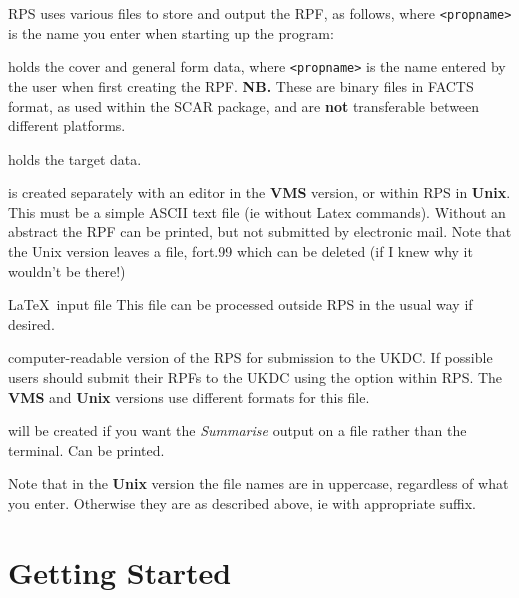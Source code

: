 RPS uses various files to store and output the RPF, as follows, where
\verb+<propname>+ is the name you enter when starting up the program:

\begin{list}%
{}{\setlength{\leftmargin}{55mm} \setlength{\labelwidth}{40mm} \setlength{\labelsep}{6mm}
\setlength{\listparindent}{0mm} }

\item[\verb+<propname>.DAT+ \hfill]  holds the cover and general form
data, where \verb+<propname>+ is the name entered by the user when
first creating the RPF. {\bf NB.} These are binary files in FACTS
format, as used within the SCAR package, and are {\bf not} transferable
between different platforms.

\item[\verb+<propname>\_TARGET.DAT+ \hfill] holds the target data. 

\item[\verb+<propname>.ABSTRACT+ \hfill] is created separately with an
editor in the {\bf VMS} version, or within RPS in {\bf Unix}.
This must be a simple ASCII text file (ie without Latex
commands).  Without an abstract the RPF can be printed, but not
submitted by electronic mail. Note that the Unix version leaves a file,
fort.99 which can be deleted (if I knew why it wouldn't be there!)

\item[\verb+<propname>.TEX+ \hfill] \LaTeX\ input file This file can be
processed outside RPS in the usual way if desired.

\item[\verb+<propname>.POST+ \hfill] computer-readable version of the
RPS for submission to the UKDC.  If possible users should submit their
RPFs to the UKDC using the option within RPS. The {\bf VMS} and {\bf
Unix} versions use different formats for this file.

\item[\verb+<propname>.LIS+ \hfill] will be created if you want the
{\em Summarise} output on a file rather than the terminal.  Can be
printed.

\end{list} Note that in the {\bf Unix} version the file names are in
uppercase, regardless of what you enter. Otherwise they are as
described above, ie with appropriate suffix.

\section{Getting Started}
 
